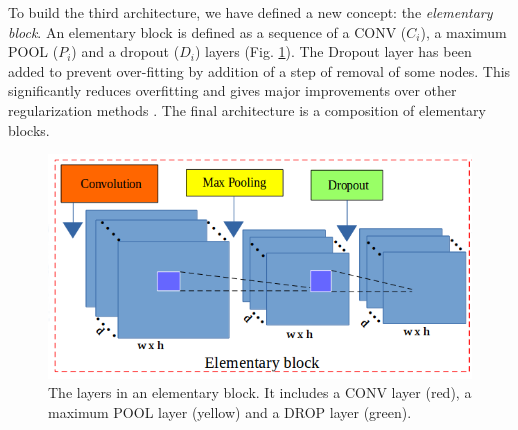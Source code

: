 \documentclass[review]{elsarticle}
\begin{document}
To build the third architecture, we have defined a new concept: the \textit{elementary block}. An {elementary block} is defined as a sequence of a CONV ($C_{i}$), a maximum POOL ($P_i$) and a dropout ($D_i$) layers (Fig. \ref{figelementary}). The Dropout layer has been added to prevent over-fitting by addition of a step of removal of some nodes. This significantly reduces overfitting and gives major improvements over other regularization methods \cite{srivastava2014dropout}. The final architecture is a composition of elementary blocks. 
\begin{figure}[h]
	\centering
	\includegraphics[scale=0.3]{images/elementary_block}
	\caption{The layers in an elementary block. It includes a CONV layer (red), a maximum POOL layer (yellow) and a DROP layer (green).}
	\label{figelementary}
\end{figure}
\end{document}
